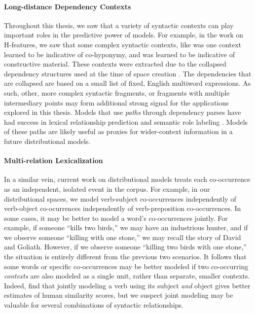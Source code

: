\paragraph{Long-distance Dependency Contexts}
Throughout this thesis, we saw that a variety of syntactic contexts can play
important roles in the predictive power of models. For example, in the work on
H-features, we saw that some complex syntactic contexts, like
 was one context learned to be indicative of
co-hyponymy, and  was learned to be indicative
of constructive material. These contexts were extracted due to the collapsed
dependency structures used at the time of space creation
\cite{marneffe:2008:techreport}. The dependencies that are collapsed are
based on a small list of fixed, English multiword expressions. As such,
other, more complex syntactic fragments, or fragments with multiple
intermediary points may form additional strong signal for the applications
explored in this thesis. Models that use {\em paths} through dependency
parses have had success in lexical relationship prediction
\cite{shwartz:2016:acl,shwartz:2016:cogalex2} and semantic role labeling
\cite{roth:2016:acl}. Models of these paths are likely useful as proxies for
wider-context information in a future distributional models.

\paragraph{Multi-relation Lexicalization}
In a similar vein, current work on distributional models treats each
co-occurrence as an independent, isolated event in the corpus. For example, in
our distributional spaces, we model verb-subject co-occurrences independently
of verb-object co-ocurrences independently of verb-preposition co-occurrences.
In some cases, it may be better to model a word's co-occurrences jointly. For
example, if someone ``kills two birds,'' we may have an industrious hunter, and
if we observe someone ``killing with one stone,'' we may recall the story of
David and Goliath. However, if we observe someone ``killing two birds with one
stone,'' the situation is entirely different from the previous two scenarios.
It follows that some words or specific co-occurrences may be better modeled
if two co-occurring {\em contexts} are also modeled as a single unit, rather
than separate, smaller contexts.
Indeed,  find that jointly modeling a verb using
its subject {\em and} object gives better estimates of human similarity
scores, but we suspect joint modeling may be valuable for several combinations
of syntactic relationships.

